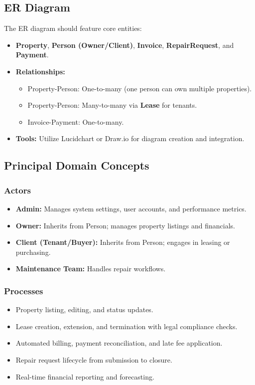 \documentclass[12pt]{article}
\begin{document}
\subsection{ER Diagram}
The ER diagram should feature core entities:
\begin{itemize}
    \item \textbf{Property}, \textbf{Person (Owner/Client)}, \textbf{Invoice}, \textbf{RepairRequest}, and \textbf{Payment}.
    \item \textbf{Relationships:}
    \begin{itemize}
        \item Property-Person: One-to-many (one person can own multiple properties).
        \item Property-Person: Many-to-many via \textbf{Lease} for tenants.
        \item Invoice-Payment: One-to-many.
    \end{itemize}
    \item \textbf{Tools:} Utilize Lucidchart or Draw.io for diagram creation and integration.
\end{itemize}

\subsection{Principal Domain Concepts}

\subsubsection{Actors}
\begin{itemize}
    \item \textbf{Admin:} Manages system settings, user accounts, and performance metrics.
    \item \textbf{Owner:} Inherits from Person; manages property listings and financials.
    \item \textbf{Client (Tenant/Buyer):} Inherits from Person; engages in leasing or purchasing.
    \item \textbf{Maintenance Team:} Handles repair workflows.
\end{itemize}

\subsubsection{Processes}
\begin{itemize}
    \item Property listing, editing, and status updates.
    \item Lease creation, extension, and termination with legal compliance checks.
    \item Automated billing, payment reconciliation, and late fee application.
    \item Repair request lifecycle from submission to closure.
    \item Real-time financial reporting and forecasting.
\end{itemize}
\end{document}
